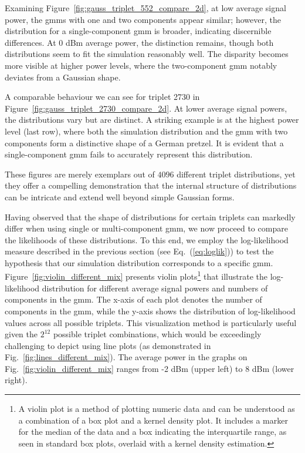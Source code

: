 Examining Figure~\ref{fig:gauss_triplet_552_compare_2d}, at low average signal power, the \acrshort{gmm}s with one and two components appear similar; however, the distribution for a single-component \acrshort{gmm} is broader, indicating discernible differences. At \(0\) dBm average power, the distinction remains, though both distributions seem to fit the simulation reasonably well. The disparity becomes more visible at higher power levels, where the two-component \acrshort{gmm} notably deviates from a Gaussian shape.

A comparable behaviour we can see for triplet 2730 in Figure~\ref{fig:gauss_triplet_2730_compare_2d}. At lower average signal powers, the distributions vary but are distinct. A striking example is at the highest power level (last row), where both the simulation distribution and the \acrshort{gmm} with two components form a distinctive shape of a German pretzel. It is evident that a single-component \acrshort{gmm} fails to accurately represent this distribution.

These figures are merely exemplars out of \(4096\) different triplet distributions, yet they offer a compelling demonstration that the internal structure of distributions can be intricate and extend well beyond simple Gaussian forms.




Having observed that the shape of distributions for certain triplets can markedly differ when using single or multi-component \gls{gmm}, we now proceed to compare the likelihoods of these distributions. To this end, we employ the log-likelihood measure described in the previous section (see Eq.~(\ref{eq:loglik})) to test the hypothesis that our simulation distribution corresponds to a specific \gls{gmm}. Figure~\ref{fig:violin_different_mix} presents violin plots\footnote{A violin plot is a method of plotting numeric data and can be understood as a combination of a box plot and a kernel density plot. It includes a marker for the median of the data and a box indicating the interquartile range, as seen in standard box plots, overlaid with a kernel density estimation.} that illustrate the log-likelihood distribution for different average signal powers and numbers of components in the \gls{gmm}. The x-axis of each plot denotes the number of components in the \gls{gmm}, while the y-axis shows the distribution of log-likelihood values across all possible triplets. This visualization method is particularly useful given the \(2^{12}\) possible triplet combinations, which would be exceedingly challenging to depict using line plots (as demonstrated in Fig.~\ref{fig:lines_different_mix}). The average power in the graphs on Fig.~\ref{fig:violin_different_mix} ranges from -2 dBm (upper left) to 8 dBm (lower right).

